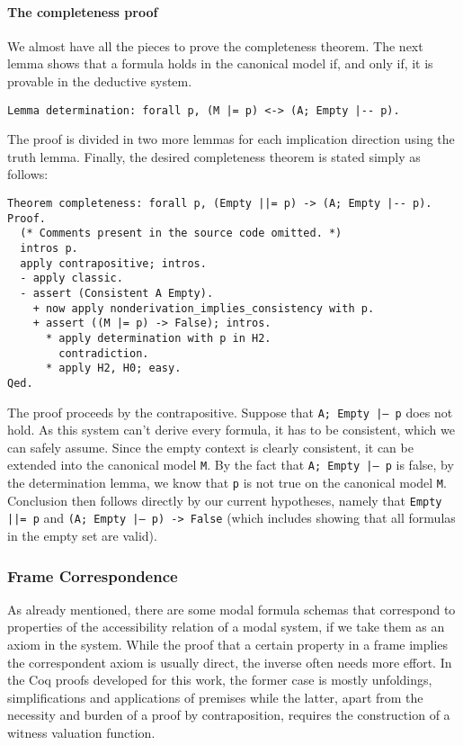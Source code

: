 \documentclass[3p,times]{elsarticle}
\begin{document}
\paragraph{The completeness proof} We almost have all the pieces to prove the completeness theorem. The next lemma
shows that a formula holds in the canonical model if, and only if, it is provable in the deductive system.
\begin{verbatim}
Lemma determination: forall p, (M |= p) <-> (A; Empty |-- p).
\end{verbatim}
The proof is divided in two more lemmas for each implication direction using the truth lemma. Finally, the desired completeness theorem is stated simply as follows:
\begin{verbatim}
Theorem completeness: forall p, (Empty ||= p) -> (A; Empty |-- p).
Proof.
  (* Comments present in the source code omitted. *)
  intros p.
  apply contrapositive; intros.
  - apply classic.
  - assert (Consistent A Empty).
    + now apply nonderivation_implies_consistency with p.
    + assert ((M |= p) -> False); intros.
      * apply determination with p in H2.
        contradiction.
      * apply H2, H0; easy.
Qed.
\end{verbatim}
The proof proceeds by the contrapositive.
Suppose that \texttt{A; Empty |-- p} does not hold.
As this system can't derive every formula, it has to be consistent, which we can safely assume.
Since the empty context is clearly consistent, it
can be extended into the canonical model \verb|M|. By the fact that
\texttt{A; Empty |-- p} is false, by the determination lemma, we know
that \verb|p| is not true on the canonical model \verb|M|. Conclusion then follows directly
by our current hypotheses, namely that \texttt{Empty ||= p} and \texttt{(A; Empty |-- p) -> False} (which includes showing that all formulas in the empty set are valid).

\subsubsection{Frame Correspondence}\label{sec:correspondence}

As already mentioned, there are some modal formula schemas that correspond
to properties of the accessibility relation of a modal system, if we take them
as an axiom in the system.  While the proof that a certain property in a frame
implies the correspondent axiom is usually  direct, the inverse often needs
more effort. In the Coq proofs developed for this work,  the former case is
mostly unfoldings, simplifications and applications of premises
while the latter, apart from the necessity and burden of a proof by contraposition,
requires the construction of a witness valuation function.
\end{document}
